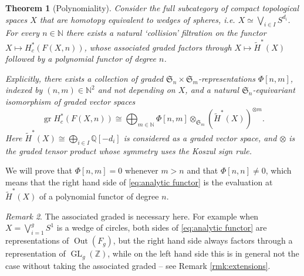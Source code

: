 \documentclass[12pt]{article}
\newcommand{\N}{\mathbb{N}}
\newcommand{\Z}{\mathbb{Z}}
\newcommand{\Q}{\mathbb{Q}}
\newcommand{\SymGroup}[1][n]{\mathfrak{S}_{#1}}
\DeclareMathOperator{\GL}{GL}
\DeclareMathOperator{\gr}{gr}
\DeclareMathOperator{\Out}{Out}
\theoremstyle{plain}
\newtheorem{thm}{Theorem}[section]
\theoremstyle{definition}
\theoremstyle{remark}
\newtheorem{rmk}[thm]{Remark}
\begin{document}
\begin{thm}[Polynomiality]\label{thm:polynomiality}
    Consider the full subcategory of compact topological spaces $X$ that are homotopy equivalent to wedges of spheres, i.e. $X \simeq \bigvee_{i\in I} S^{d_i}$. For every $n\in \N$ there exists a natural `collision' filtration on the functor $X\mapsto H_c^{\ast}(F(X, n))$, whose associated graded factors through $X\mapsto\tilde{H}^*(X)$ followed by a polynomial functor of degree $n$.
    
    Explicitly, there exists a collection of graded $\SymGroup\times\SymGroup[m]$-representations $\Phi[n,m]$, indexed by $(n,m)\in \N^2$ and not depending on $X$, and a natural $\SymGroup$-equivariant isomorphism of graded vector spaces
    \begin{equation} \label{eq:analytic functor}
    \gr H_c^{*}(F(X, n)) \cong \bigoplus_{m\in\N} {\Phi[n, m]\otimes_{\SymGroup[m]}(\tilde{H}^{\ast}(X))^{\otimes m}}.
    \end{equation}
    Here $\tilde{H}^{\ast}(X) \cong \bigoplus_{i\in I}\Q[-d_i]$ is considered as a graded vector space, and $\otimes$ is the graded tensor product whose symmetry uses the Koszul sign rule.
\end{thm}

We will prove that $\Phi[n,m]=0$ whenever $m>n$ and that $\Phi[n,n]\neq 0$, which means that the right hand side of \eqref{eq:analytic functor} is the evaluation at $\tilde{H}^*(X)$ of a polynomial functor of degree $n$.

\begin{rmk}
    The associated graded is necessary here. For example when $X = \bigvee_{i=1}^g{S^1}$ is a wedge of circles, both sides of \eqref{eq:analytic functor} are representations of $\Out(F_g)$, but the right hand side always factors through a representation of $\GL_g(\Z)$, while on the left hand side this is in general not the case without taking the associated graded -- see Remark \ref{rmk:extensions}.
\end{rmk}

    
\end{document}
